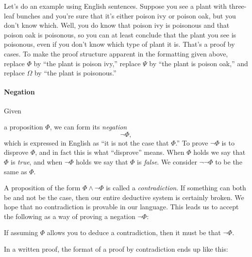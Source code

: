 \documentclass[12pt]{article}
\newcommand{\AND}{\wedge}
\newcounter{rule}
\newcounter{theorem}
\def\putRuleNumber{\refstepcounter{rule}\therule}
\def\putThmNumber{\refstepcounter{theorem}\thetheorem}
\newcommand{\indented}[1]{\begin{adjustwidth}{1em}{}#1\end{adjustwidth}}
\def\thmcolonspace{\hspace{1em}}
\newcommand{\thmbox}[1]{\fbox{\parbox{\textwidth}{{#1}}}}
\newcommand{\THM}[1]{\thmbox{\textbf{Theorem \putThmNumber:} \thmcolonspace #1}}
\newcommand{\RULE}[2]{\begin{tcolorbox}[title=Rule \putRuleNumber: #1,colbacktitle=white,coltitle=black,colback=white]#2\end{tcolorbox}}
\def\pA{\Phi}
\def\pB{\Psi}
\def\pC{\Omega}
\begin{document}
Let's do an example using English sentences.
Suppose you see a plant with three-leaf bunches and you're sure that it's either poison ivy or poison oak, but you don't know which.
Well, you do know that poison ivy is poisonous and that poison oak is poisonous, so you can at least conclude that the plant you see is poisonous, even
if you don't know which type of plant it is.
That's a proof by cases.
To make the proof structure apparent in
the formatting given above, replace $\pA$ by ``the plant is poison ivy,'' replace $\pB$ by ``the plant is poison oak,'' and replace $\pC$ by ``the plant is poisonous.''


\paragraph{Negation}
\hypertarget{hl:NOT}{Given} a proposition $\pA$, we can form its \emph{negation}
$$
\neg \pA,
$$
which is expressed in English as ``it is not the case that $\pA$.''
To prove $\neg\pA$ is to disprove $\pA$, and in fact this is what ``disprove'' means.
When $\pA$ holds we say that $\pA$ is \emph{true}, and when $\neg\pA$ holds we say that $\pA$ is \emph{false}.
We consider $\neg\neg\pA$ to be the same as $\pA$.

A proposition of the form $\pA\AND\neg\pA$ is called a \emph{contradiction}.
If something can both be and not be the case, then our entire deductive system is certainly broken.
We hope that no contradiction is provable in our language.
\hypertarget{hl:NOTPV}{This} leads us to accept the following as a way of proving a negation $\neg\pA$:
\RULE{Proof by contradiction}{
If assuming $\pA$ allows you to deduce a contradiction, then it must be that $\neg\pA$.
}
In a written proof, the format of a proof by contradiction ends up like this:
\end{document}
